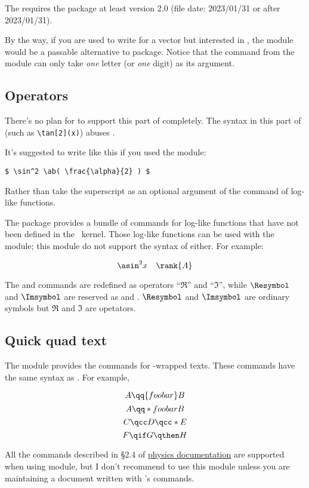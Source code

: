 \documentclass[11pt,letterpaper]{article}
\begin{document}
The  requires the  package at least
version 2.0 (file date: 2023/01/31 or after 2023/01/31).

By the way, if you are used to write  for a vector but interested in
, the  module would be a passable
alternative to  package. Notice that the  command from the
 module can only take \emph{one} letter (or \emph{one} digit)
as its argument.

\subsection{Operators}
There's no plan for  to support this part of 
completely. The syntax in this part of  (such as \verb|\tan[2](x)|)
abuses .

It's suggested to write like this if you used the  module:
\begin{Verbatim}[fontsize=\small]
$ \sin^2 \ab( \frac{\alpha}{2} ) $
\end{Verbatim}
Rather than take the superscript as an optional argument of the command of
log-like functions.

The  package provides a bundle of commands for log-like functions
that have not been defined in the \LaTeXe\ kernel. Those log-like functions
can be used with the  module; this module do not support
the syntax of  either. For example:
\begin{example}
\[ \asin^2 x \quad \rank \{ A \} \]
\end{example}
The  and  commands are redefined as operators ``$\Re$'' and
``$\Im$'', while $\Resymbol$ and $\Imsymbol$ are reserved as  and
. $\Resymbol$ and $\Imsymbol$ are ordinary symbols but $\Re$ and
$\Im$ are opetators.

\subsection{Quick quad text}\label{subsec:qtext}
The  module provides the  commands
for -wrapped texts. These commands have the same syntax as
. For example,
\begin{example}
\[ A \qq {foo bar} B \]
\[ A \qq*{foo bar} B \]
\[ C \qcc D \qcc*  E \]
\[ F \qif G \qthen H \]
\end{example}
All the commands described in \S2.4 of
\hyperref{http://mirrors.ctan.org/macros/latex/contrib/physics/physics.pdf}{}{}%
{\textsf{physics} documentation} are supported when using 
module, but I don't recommend to use this module unless you are maintaining a
document written with 's  commands.
\end{document}
